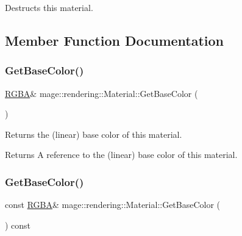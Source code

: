 Destructs this material. 

\subsection{Member Function Documentation}
\mbox{\label{classmage_1_1rendering_1_1_material_a9dd92f97dbae7cfbdae55759c20f6887}} 
\subsubsection{\texorpdfstring{Get\+Base\+Color()}{GetBaseColor()}\hspace{0.1cm}{\footnotesize\ttfamily [1/2]}}
{\footnotesize\ttfamily \mbox{\hyperlink{structmage_1_1_r_g_b_a}{R\+G\+BA}}\& mage\+::rendering\+::\+Material\+::\+Get\+Base\+Color (\begin{DoxyParamCaption}{ }\end{DoxyParamCaption})\hspace{0.3cm}{\ttfamily [noexcept]}}

Returns the (linear) base color of this material.

\begin{DoxyReturn}{Returns}
A reference to the (linear) base color of this material. 
\end{DoxyReturn}
\mbox{\label{classmage_1_1rendering_1_1_material_aa98da3297c5043b9107638c877382bd8}} 
\subsubsection{\texorpdfstring{Get\+Base\+Color()}{GetBaseColor()}\hspace{0.1cm}{\footnotesize\ttfamily [2/2]}}
{\footnotesize\ttfamily const \mbox{\hyperlink{structmage_1_1_r_g_b_a}{R\+G\+BA}}\& mage\+::rendering\+::\+Material\+::\+Get\+Base\+Color (\begin{DoxyParamCaption}{ }\end{DoxyParamCaption}) const\hspace{0.3cm}{\ttfamily [noexcept]}}

